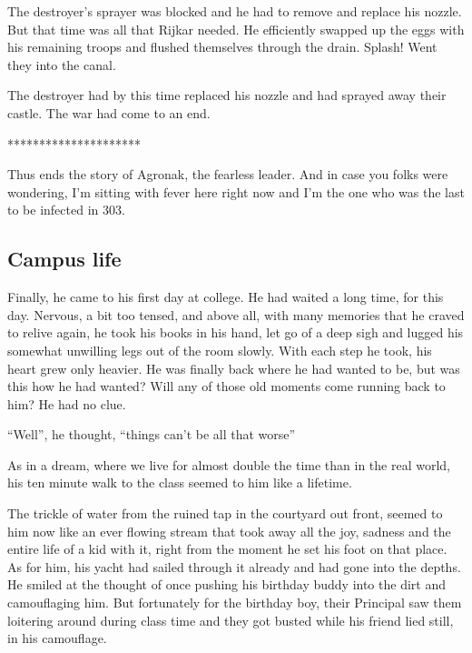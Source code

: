 \documentclass[twoside,11pt,titlepage]{article}
\begin{document}
The destroyer's sprayer was blocked and he had to remove and replace his nozzle. But that time was all that Rijkar needed. He efficiently swapped up the eggs with his remaining troops and flushed themselves through the drain. Splash! Went they into the canal.

The destroyer had by this time replaced his nozzle and had sprayed away their castle. The war had come to an end.

\bigskip
\begin{center}
*********************
\end{center}


Thus ends the story of Agronak, the fearless leader. And in case you folks were wondering, I'm sitting with fever here right now and I'm the one who was the last to be infected in 303.

\newpage
\begin{center}
  \section{Campus life}
\end{center}
\bigskip
\bigskip
\bigskip


Finally, he came to his first day at college. He had waited a long time, for this day. Nervous, a bit too tensed, and above all, with many memories that he craved to relive again, he took his books in his hand, let go of a deep sigh and lugged his somewhat unwilling legs out of the room slowly. With each step he took, his heart grew only heavier. He was finally back where he had wanted to be, but was this how he had wanted? Will any of those old moments come running back to him? He had no clue.

``Well'', he thought, ``things can't be all that worse''

As in a dream, where we live for almost double the time than in the real world, his ten minute walk to the class seemed to him like a lifetime.

The trickle of water from the ruined tap in the courtyard out front, seemed to him now like an ever flowing stream that took away all the joy, sadness and the entire life of a kid with it, right from the moment he set his foot on that place. As for him, his yacht had sailed through it already and had gone into the depths. He smiled at the thought of once pushing his birthday buddy into the dirt and camouflaging him. But fortunately for the birthday boy, their Principal saw them loitering around during class time and they got busted while his friend lied still, in his camouflage.
\end{document}

